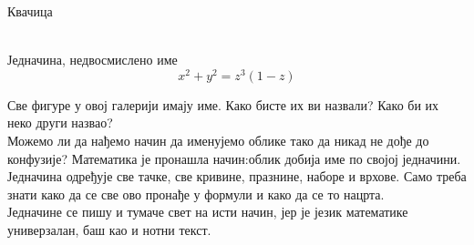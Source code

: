 \documentclass[sr]{./../../common/SurferDesc}%
\begin{document}
\footnotesize

 

\begin{surferPage}
  \begin{surferTitle}Квачица\end{surferTitle}  \\
Једначина, недвосмислено име \\
\smallskip
\[x^2 + y^2	= z^3	(1 - z) \]


\singlespacing
Све фигуре у овој галерији имају име. Како бисте их ви назвали? Како би их неко други назвао?\\
\vspace{0.3cm}
Можемо ли да нађемо начин да именујемо облике тако да никад не дође до конфузије? Математика је пронашла начин:облик добија име по својој једначини. Једначина одређује све тачке, све кривине, празнине, наборе и врхове. Само треба знати како да се све ово пронађе у формули и како да се то нацрта.\\
\vspace{0.3cm}
Једначине се пишу и тумаче свет на исти начин, јер је језик математике универзалан, баш као и нотни текст. 

  \begin{surferText}
     \end{surferText}
\end{surferPage}
\end{document}
